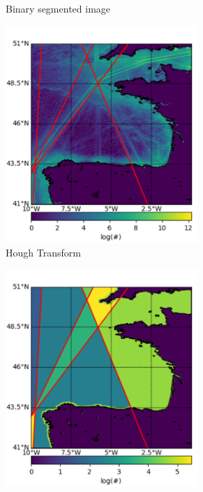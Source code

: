 \documentclass{article}
\begin{document}
\begin{figure}[ht]
\begin{subfigure}[b]{0.5\linewidth}
    \caption{Binary segmented image} 
    \label{fig7:b} 
    \vspace{4ex}
  \end{subfigure} 
  \begin{subfigure}[b]{0.5\linewidth}
    \centering
    \includegraphics[width=0.8\textwidth]{CELTIClines-crop.pdf} 
    \caption{Hough Transform} 
    \label{fig7:c} 
  \end{subfigure}%
  \begin{subfigure}[b]{0.5\linewidth}
    \centering
    \includegraphics[width=0.8\textwidth]{CELTICsegmented-crop.pdf} 

\end{subfigure}
\end{figure}
\end{document}
